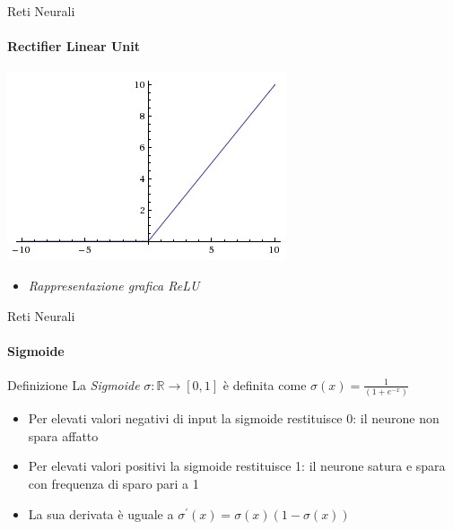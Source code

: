 \documentclass[
 ]{beamer}
\begin{document}
\begin{frame}{Reti Neurali}
    \framesubtitle{Rectifier Linear Unit}
    
    \begin{center}
      \includegraphics[scale = 0.6]{relu.jpeg}
    \end{center}
  
    \bigskip 
  
  \begin{itemize}
    \setlength\itemsep{1em}
    \item[] \large \emph{Rappresentazione grafica ReLU}
  \end{itemize}       
\end{frame} 

\begin{frame}{Reti Neurali}
    \framesubtitle{Sigmoide}
    \begin{block}{Definizione} 
        \large La \emph{Sigmoide} $\sigma: \mathbb{R} \rightarrow [0, 1]$ è definita come $\sigma(x) = \frac{1}{(1 + e^{-x})}$ 
    \end{block}\pause
    
    \bigskip
    
    \begin{itemize} [<+->]
        \setlength\itemsep{2em}
        \item \large Per elevati valori negativi di input la sigmoide restituisce 0: il neurone non spara affatto
        \item \large Per elevati valori positivi la sigmoide restituisce 1: il neurone satura e spara con frequenza di sparo pari a 1
        \item \large La sua derivata è uguale a $\sigma^{\prime}(x) = \sigma(x)(1 - \sigma(x))$
    \end{itemize}
\end{frame}
\end{document}
